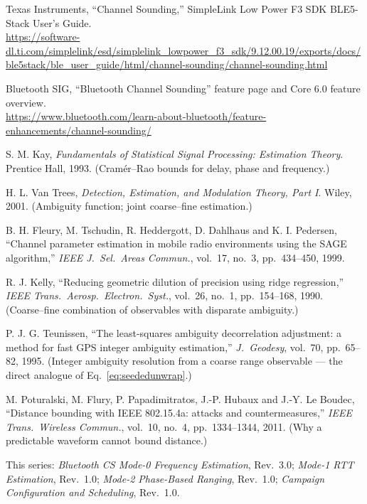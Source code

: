 \documentclass[11pt,a4paper]{article}
\begin{document}
\begin{enumerate}[label={[\arabic*]},leftmargin=2.2em,itemsep=3pt]
\item Texas Instruments, ``Channel Sounding,'' SimpleLink Low Power F3 SDK BLE5-Stack User's Guide.\\
  {\small\url{https://software-dl.ti.com/simplelink/esd/simplelink_lowpower_f3_sdk/9.12.00.19/exports/docs/ble5stack/ble_user_guide/html/channel-sounding/channel-sounding.html}}

\item Bluetooth SIG, ``Bluetooth Channel Sounding'' feature page and Core 6.0 feature overview.\\
  {\small\url{https://www.bluetooth.com/learn-about-bluetooth/feature-enhancements/channel-sounding/}}

\item S. M. Kay, \emph{Fundamentals of Statistical Signal Processing: Estimation Theory}.
  Prentice Hall, 1993. (Cram\'er--Rao bounds for delay, phase and frequency.)

\item H. L. Van Trees, \emph{Detection, Estimation, and Modulation Theory, Part I}. Wiley, 2001.
  (Ambiguity function; joint coarse--fine estimation.)

\item B. H. Fleury, M. Tschudin, R. Heddergott, D. Dahlhaus and K. I. Pedersen, ``Channel parameter
  estimation in mobile radio environments using the SAGE algorithm,'' \emph{IEEE J.\ Sel.\ Areas
  Commun.}, vol.\ 17, no.\ 3, pp.\ 434--450, 1999.

\item R. J. Kelly, ``Reducing geometric dilution of precision using ridge regression,'' \emph{IEEE
  Trans.\ Aerosp.\ Electron.\ Syst.}, vol.\ 26, no.\ 1, pp.\ 154--168, 1990. (Coarse--fine
  combination of observables with disparate ambiguity.)

\item P. J. G. Teunissen, ``The least-squares ambiguity decorrelation adjustment: a method for fast
  GPS integer ambiguity estimation,'' \emph{J.\ Geodesy}, vol.\ 70, pp.\ 65--82, 1995.
  (Integer ambiguity resolution from a coarse range observable --- the direct analogue of
  Eq.~\eqref{eq:seededunwrap}.)

\item M. Poturalski, M. Flury, P. Papadimitratos, J.-P. Hubaux and J.-Y. Le Boudec, ``Distance
  bounding with IEEE 802.15.4a: attacks and countermeasures,'' \emph{IEEE Trans.\ Wireless
  Commun.}, vol.\ 10, no.\ 4, pp.\ 1334--1344, 2011. (Why a predictable waveform cannot bound
  distance.)

\item This series: \emph{Bluetooth CS Mode-0 Frequency Estimation}, Rev.\ 3.0;
  \emph{Mode-1 RTT Estimation}, Rev.\ 1.0; \emph{Mode-2 Phase-Based Ranging}, Rev.\ 1.0;
  \emph{Campaign Configuration and Scheduling}, Rev.\ 1.0.
\end{enumerate}
\end{document}
